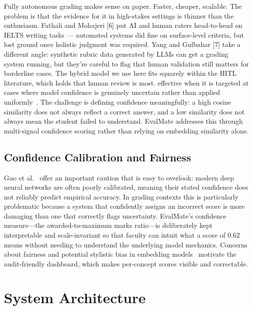 \documentclass[conference]{IEEEtran}
\begin{document}
Fully autonomous grading makes sense on paper. Faster, cheaper, scalable. The problem is that the evidence for it in high-stakes settings is thinner than the enthusiasm. Fathali and Mohajeri [6] put AI and human raters head-to-head on IELTS writing tasks — automated systems did fine on surface-level criteria, but lost ground once holistic judgment was required. Yang and Gulbahar [7] take a different angle: synthetic rubric data generated by LLMs can get a grading system running, but they're careful to flag that human validation still matters for borderline cases. The hybrid model we use here fits squarely within the HITL literature, which holds that human review is most. effective when
it is targeted at cases where model confidence is genuinely
uncertain rather than applied uniformly~\cite{sibarani2025}. The
challenge is defining confidence meaningfully: a high cosine
similarity does not always reflect a correct answer, and a low
similarity does not always mean the student failed to understand.
EvalMate addresses this through multi-signal confidence scoring
rather than relying on embedding similarity alone.

\subsection{Confidence Calibration and Fairness}

Guo et al.~\cite{guo2017} offer an important caution that is easy
to overlook: modern deep neural networks are often poorly calibrated,
meaning their stated confidence does not reliably predict empirical
accuracy. In grading contexts this is particularly problematic
because a system that confidently assigns an incorrect score is more
damaging than one that correctly flags uncertainty. EvalMate's
confidence measure---the awarded-to-maximum marks ratio---is
deliberately kept interpretable and scale-invariant so that faculty
can intuit what a score of 0.62 means without needing to understand
the underlying model mechanics. Concerns about fairness and potential
stylistic bias in embedding models~\cite{tristan2024} motivate the
audit-friendly dashboard, which makes per-concept scores visible and
correctable.

\section{System Architecture}
\end{document}
